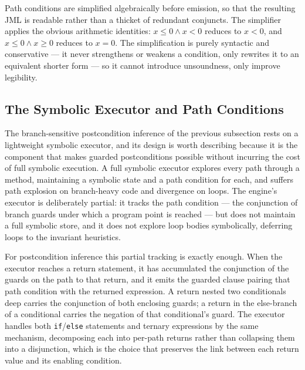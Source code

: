 Path conditions are simplified algebraically before emission, so that the
resulting JML is readable rather than a thicket of redundant conjuncts. The
simplifier applies the obvious arithmetic identities: $x \le 0 \wedge x < 0$
reduces to $x < 0$, and $x \le 0 \wedge x \ge 0$ reduces to $x = 0$. The
simplification is purely syntactic and conservative --- it never strengthens or
weakens a condition, only rewrites it to an equivalent shorter form --- so it
cannot introduce unsoundness, only improve legibility.

\subsection{The Symbolic Executor and Path Conditions}

The branch-sensitive postcondition inference of the previous subsection rests on
a lightweight symbolic executor, and its design is worth describing because it is
the component that makes guarded postconditions possible without incurring the
cost of full symbolic execution. A full symbolic executor explores every path
through a method, maintaining a symbolic state and a path condition for each, and
suffers path explosion on branch-heavy code and divergence on loops. The engine's
executor is deliberately partial: it tracks the path condition --- the conjunction
of branch guards under which a program point is reached --- but does not maintain a
full symbolic store, and it does not explore loop bodies symbolically, deferring
loops to the invariant heuristics.

For postcondition inference this partial tracking is exactly enough. When the
executor reaches a return statement, it has accumulated the conjunction of the
guards on the path to that return, and it emits the guarded clause pairing that
path condition with the returned expression. A return nested two conditionals deep
carries the conjunction of both enclosing guards; a return in the else-branch of a
conditional carries the negation of that conditional's guard. The executor handles
both \texttt{if}/\texttt{else} statements and ternary expressions by the same
mechanism, decomposing each into per-path returns rather than collapsing them into
a disjunction, which is the choice that preserves the link between each return
value and its enabling condition.

